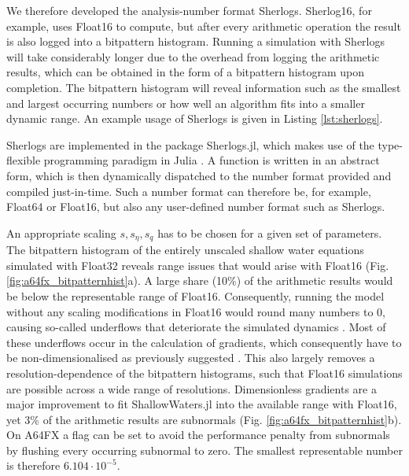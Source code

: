 We therefore developed the analysis-number format Sherlogs. Sherlog16, for example, uses Float16 to compute,
but after every arithmetic operation the result is also logged into a bitpattern histogram. Running a simulation with
Sherlogs will take considerably longer due to the overhead from logging the arithmetic results, which can be obtained
in the form of a bitpattern histogram upon completion. The bitpattern histogram will reveal information such as the
smallest and largest occurring numbers or how well an algorithm fits into a smaller dynamic range.
An example usage of Sherlogs is given in Listing \ref{lst:sherlogs}.

Sherlogs are implemented in the package Sherlogs.jl, which makes use of the type-flexible
programming paradigm in Julia \citep{Bezanson2017}. A function is written in an abstract form,
which is then dynamically dispatched to the number format provided and compiled just-in-time.
Such a number format can therefore be, for example, Float64 or Float16, but also any user-defined
number format such as Sherlogs.

An appropriate scaling $s,s_\eta,s_q$ has to be chosen for a given set of parameters. The bitpattern
histogram of the entirely unscaled shallow water equations simulated with Float32 reveals range issues
that would arise with Float16 (Fig. \ref{fig:a64fx_bitpatternhist}a). A large share (10\%) of the arithmetic
results would be below the representable range of Float16. Consequently, running the model without
any scaling modifications in Float16 would round many numbers to 0, causing so-called underflows
that deteriorate the simulated dynamics \citep{Klower2020b}. Most of these underflows occur in the
calculation of gradients, which consequently have to be non-dimensionalised as previously suggested
\citep{Klower2019a}. This also largely removes a resolution-dependence of the bitpattern histograms,
such that Float16 simulations are possible across a wide range of resolutions. Dimensionless gradients
are a major improvement to fit ShallowWaters.jl into the available range with Float16, yet 3\% of the
arithmetic results are subnormals (Fig. \ref{fig:a64fx_bitpatternhist}b). On A64FX a flag can be set to
avoid the performance penalty from subnormals by flushing every occurring subnormal to zero.
The smallest representable number is therefore $6.104 \cdot 10^{-5}$.

